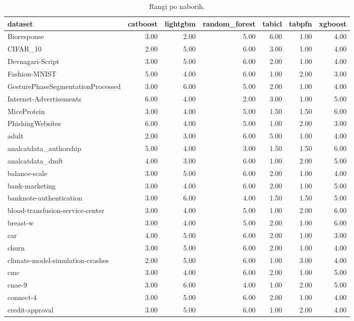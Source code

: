 \begin{table}[htbp]
\centering
\caption{Rangi po naborih.}
\label{tab:ranks}
\begin{tabular}{lrrrrrr}
\hline
dataset & catboost & lightgbm & random\_forest & tabicl & tabpfn & xgboost \\
\hline
Bioresponse & 3.00 & 2.00 & 5.00 & 6.00 & 1.00 & 4.00 \\
CIFAR\_10 & 2.00 & 5.00 & 6.00 & 3.00 & 1.00 & 4.00 \\
Devnagari-Script & 3.00 & 5.00 & 6.00 & 2.00 & 1.00 & 4.00 \\
Fashion-MNIST & 5.00 & 4.00 & 6.00 & 1.00 & 2.00 & 3.00 \\
GesturePhaseSegmentationProcessed & 3.00 & 6.00 & 5.00 & 2.00 & 1.00 & 4.00 \\
Internet-Advertisements & 6.00 & 4.00 & 2.00 & 3.00 & 1.00 & 5.00 \\
MiceProtein & 3.00 & 4.00 & 5.00 & 1.50 & 1.50 & 6.00 \\
PhishingWebsites & 6.00 & 4.00 & 5.00 & 1.00 & 2.00 & 3.00 \\
adult & 2.00 & 3.00 & 6.00 & 5.00 & 1.00 & 4.00 \\
analcatdata\_authorship & 5.00 & 4.00 & 3.00 & 1.50 & 1.50 & 6.00 \\
analcatdata\_dmft & 4.00 & 3.00 & 6.00 & 1.00 & 2.00 & 5.00 \\
balance-scale & 3.00 & 5.00 & 6.00 & 2.00 & 1.00 & 4.00 \\
bank-marketing & 3.00 & 4.00 & 6.00 & 2.00 & 1.00 & 5.00 \\
banknote-authentication & 3.00 & 6.00 & 4.00 & 1.50 & 1.50 & 5.00 \\
blood-transfusion-service-center & 3.00 & 4.00 & 5.00 & 1.00 & 2.00 & 6.00 \\
breast-w & 3.00 & 4.00 & 5.00 & 2.00 & 1.00 & 6.00 \\
car & 4.00 & 5.00 & 6.00 & 2.00 & 1.00 & 3.00 \\
churn & 3.00 & 5.00 & 6.00 & 2.00 & 1.00 & 4.00 \\
climate-model-simulation-crashes & 2.00 & 5.00 & 6.00 & 1.00 & 3.00 & 4.00 \\
cmc & 3.00 & 4.00 & 6.00 & 2.00 & 1.00 & 5.00 \\
cnae-9 & 3.00 & 6.00 & 4.00 & 1.00 & 2.00 & 5.00 \\
connect-4 & 3.00 & 5.00 & 6.00 & 2.00 & 1.00 & 4.00 \\
credit-approval & 3.00 & 5.00 & 6.00 & 1.00 & 2.00 & 4.00 \\

\end{tabular}
\end{table}
